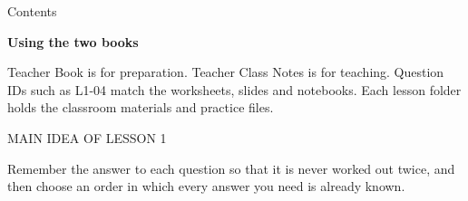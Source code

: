 \documentclass[11pt,a4paper,oneside]{report}
\newcommand{\lessonnumber}{0}\newcommand{\lessonheading}{Teacher Book}\hypersetup{pdftitle={Dynamic Programming: From Recursion to Efficient Solutions - Teacher Book},pdfauthor={fifteen02},bookmarksopen=true}
\begin{document}
{\begin{minipage}{176mm}{\heavy\fontsize{28}{33}\selectfont Contents\par}
\noindent\begin{minipage}[t][29mm][t]{176mm}\vspace{5mm}\begin{minipage}[t]{18mm}\end{minipage}\begin{minipage}[t]{140mm}\end{minipage}\begin{minipage}[t]{18mm}\vspace{0pt}\raggedleft{\heavy\fontsize{14}{18}\selectfont\pageref{lesson-5}}\end{minipage}\end{minipage}\par
\vspace{5mm}\begin{minipage}{140mm}\raggedright\textbf{Using the two books}\par Teacher Book is for preparation. Teacher Class Notes is for teaching. Question IDs such as L1-04 match the worksheets, slides and notebooks. Each lesson folder holds the classroom materials and practice files.\end{minipage}\end{minipage}}
\clearpage\renewcommand{\lessonnumber}{1}\renewcommand{\lessonheading}{Lesson 1 · Staircase and Frog}\setcounter{chapter}{0}\setcounter{section}{0}\label{lesson-1}
\noindent{}\par\vspace{5mm}
\begin{mainidea}{\color{quiet}\heavy\fontsize{9}{11}\selectfont MAIN IDEA OF LESSON 1}\par{}\par\smallskip Remember the answer to each question so that it is never worked out twice, and then choose an order in which every answer you need is already known.\end{mainidea}
\end{document}
